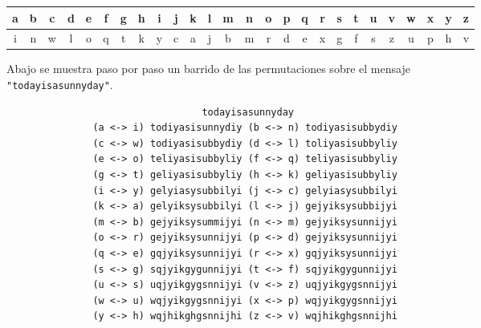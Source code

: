 \documentclass[11pt,letterpaper]{exam}
\begin{document}
\begin{questions}
	{\tiny
	\begin{center}
	\begin{tabular}{c|c|c|c|c|c|c|c|c|c|c|c|c|c|c|c|c|c|c|c|c|c|c|c|c|c}
	
	a & b & c & d & e & f & g & h & i & j & k & l & m & n & o & p & q & r & s & t & u & v & w & x & y & z  \\
	\hline
	i & n & w & l & o & q & t & k & y & c & a & j & b & m & r & d & e & x & g & f & s & z & u & p & h & v 
	\end{tabular}
	\end{center}
	}

Abajo se muestra paso por paso un barrido de las permutaciones sobre el mensaje \\ \verb+"todayisasunnyday"+.

\begin{verbatim}
                                  todayisasunnyday
               (a <-> i) todiyasisunnydiy (b <-> n) todiyasisubbydiy
               (c <-> w) todiyasisubbydiy (d <-> l) toliyasisubbyliy
               (e <-> o) teliyasisubbyliy (f <-> q) teliyasisubbyliy
               (g <-> t) geliyasisubbyliy (h <-> k) geliyasisubbyliy
               (i <-> y) gelyiasysubbilyi (j <-> c) gelyiasysubbilyi
               (k <-> a) gelyiksysubbilyi (l <-> j) gejyiksysubbijyi
               (m <-> b) gejyiksysummijyi (n <-> m) gejyiksysunnijyi
               (o <-> r) gejyiksysunnijyi (p <-> d) gejyiksysunnijyi
               (q <-> e) gqjyiksysunnijyi (r <-> x) gqjyiksysunnijyi
               (s <-> g) sqjyikgygunnijyi (t <-> f) sqjyikgygunnijyi
               (u <-> s) uqjyikgygsnnijyi (v <-> z) uqjyikgygsnnijyi
               (w <-> u) wqjyikgygsnnijyi (x <-> p) wqjyikgygsnnijyi
               (y <-> h) wqjhikghgsnnijhi (z <-> v) wqjhikghgsnnijhi
\end{verbatim}

\end{questions}
\end{document}
